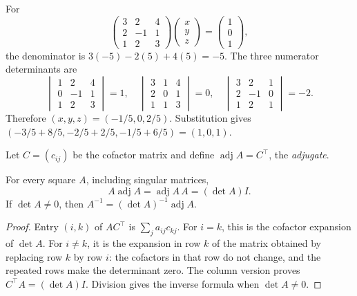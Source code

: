 \begin{example}
For
\[
 \begin{pmatrix}3&2&4\\2&-1&1\\1&2&3\end{pmatrix}
 \begin{pmatrix}x\\y\\z\end{pmatrix}
 =\begin{pmatrix}1\\0\\1\end{pmatrix},
\]
the denominator is
\(3(-5)-2(5)+4(5)=-5\). The three numerator determinants are
\[
 \begin{vmatrix}1&2&4\\0&-1&1\\1&2&3\end{vmatrix}=1,\quad
 \begin{vmatrix}3&1&4\\2&0&1\\1&1&3\end{vmatrix}=0,\quad
 \begin{vmatrix}3&2&1\\2&-1&0\\1&2&1\end{vmatrix}=-2.
\]
Therefore \((x,y,z)=(-1/5,0,2/5)\). Substitution gives
\((-3/5+8/5,-2/5+2/5,-1/5+6/5)=(1,0,1)\).
\end{example}

Let \(C=(c_{ij})\) be the cofactor matrix and define
\(\operatorname{adj}A=C^\top\), the \emph{adjugate}.

\begin{proposition}\label{prop:07:adj}
For every square \(A\), including singular matrices,
\[
 A\operatorname{adj}A=\operatorname{adj}A\,A=(\det A)I.
\]
If \(\det A\ne0\), then \(A^{-1}=(\det A)^{-1}\operatorname{adj}A\).
\end{proposition}
\begin{proof}
Entry \((i,k)\) of \(AC^\top\) is \(\sum_j a_{ij}c_{kj}\).
For \(i=k\), this is the cofactor expansion of \(\det A\).
For \(i\ne k\), it is the expansion in row \(k\) of the matrix obtained by
replacing row \(k\) by row \(i\): the cofactors in that row do not change,
and the repeated rows make the determinant zero. The column version
proves \(C^\top A=(\det A)I\). Division gives the inverse formula when
\(\det A\ne0\).
\end{proof}

